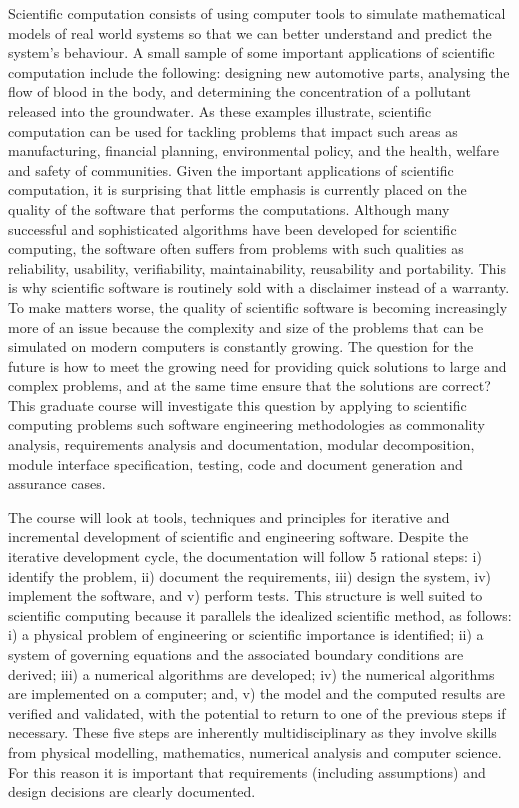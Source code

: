 \documentclass[12pt]{article}
\begin{document}
Scientific computation consists of using computer tools to simulate mathematical
models of real world systems so that we can better understand and predict the
system's behaviour.  A small sample of some important applications of scientific
computation include the following: designing new automotive parts, analysing the
flow of blood in the body, and determining the concentration of a pollutant
released into the groundwater.  As these examples illustrate, scientific
computation can be used for tackling problems that impact such areas as
manufacturing, financial planning, environmental policy, and the health, welfare
and safety of communities.  Given the important applications of scientific
computation, it is surprising that little emphasis is currently placed on the
quality of the software that performs the computations.  Although many
successful and sophisticated algorithms have been developed for scientific
computing, the software often suffers from problems with such qualities as
reliability, usability, verifiability, maintainability, reusability and
portability.  This is why scientific software is routinely sold with a
disclaimer instead of a warranty.  To make matters worse, the quality of
scientific software is becoming increasingly more of an issue because the
complexity and size of the problems that can be simulated on modern computers is
constantly growing.  The question for the future is how to meet the growing need
for providing quick solutions to large and complex problems, and at the same
time ensure that the solutions are correct?  This graduate course will
investigate this question by applying to scientific computing problems such
software engineering methodologies as commonality analysis, requirements
analysis and documentation, modular decomposition, module interface
specification, testing, code and document generation and assurance cases.  

The course will look at tools, techniques and principles for iterative and
incremental development of scientific and engineering software.  Despite the
iterative development cycle, the documentation will follow 5 rational steps: i)
identify the problem, ii) document the requirements, iii) design the system, iv)
implement the software, and v) perform tests.  This structure is well suited to
scientific computing because it parallels the idealized scientific method, as
follows: i) a physical problem of engineering or scientific importance is
identified; ii) a system of governing equations and the associated boundary
conditions are derived; iii) a numerical algorithms are developed; iv) the
numerical algorithms are implemented on a computer; and, v) the model and the
computed results are verified and validated, with the potential to return to one
of the previous steps if necessary.  These five steps are inherently
multidisciplinary as they involve skills from physical modelling, mathematics,
numerical analysis and computer science.  For this reason it is important that
requirements (including assumptions) and design decisions are clearly
documented.
\end{document}
